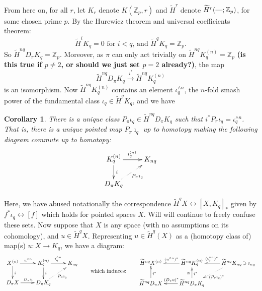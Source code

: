\documentclass{article}
\newcommand{\Z}{\mathbb{Z}}
\newcommand{\sprod}{\wedge}
\newtheorem{cor}[thm]{Corollary}
\begin{document}
From here on, for all $r$, let $K_r$ denote $K(\Z_p,r)$ and $\widetilde H^r$ denote $\widetilde H^r(\textup{---};\Z_p)$, for some chosen prime $p$.  By the Hurewicz theorem and universal coefficients theorem: %
\[\widetilde H^iK_q=0\text{ \ for $i<q$, and \ }\widetilde H^qK_q=\Z_p.\]
So $\widetilde H^{nq}D_\pi K_q= \Z_p$.  Moreover, as $\pi$ can only act trivially on $\widetilde H^{nq} K_q^{(n)}=\Z_p$ \textbf{(is this true if $p\neq2$, or should we just set $p=2$ already?)}, the map
\[
\widetilde H^{nq} D_\pi K_q \xrightarrow{\ i^*\,} \widetilde H^{nq} K_q^{(n)} %
\]
is an isomorphism.  Now $\widetilde H^{nq} K_q^{(n)}$ contains an element $\iota_q^{\sprod n}$, the $n$-fold smash power of the fundamental class $\iota_q \in \widetilde H^q K_q$, and we have
\begin{cor}
There is a unique class $P_\pi \iota_q \in \widetilde H^{nq} D_\pi K_q$ such that $i^* P_\pi \iota_q = \iota_q^{\sprod n}$. That is, there is a unique pointed map $P_\pi\imath_q$ up to homotopy making the following diagram commute up to homotopy:
\[\xymatrix@R=6mm{
K_q^{(n)}\ar[d]^i\ar[r]^{\imath_q^{(n)}}&
K_{nq}\\
D_\pi K_q\ar@{.>}[ru]_{P_\pi\imath_q}
}\]
\end{cor}
\noindent Here, we have abused notationally the correspondence
$\widetilde H^q X  \longleftrightarrow [X, K_q]_\ast$ given by %
$f^* \iota_q  \longleftrightarrow [f]$ which holds for pointed spaces $X$. Will will continue to freely confuse these sets.
Now suppose that $X$ is any space (with no assumptions on its cohomology), and $u\in\widetilde H^qX$.
Representing $u\in \widetilde H^q(X)$ as a (homotopy class of) map(s) $u: X \to K_q$, we have a diagram:%
\[\xymatrix@R=6mm{
X^{(n)}\ar[r]^{u^{\wedge n}}\ar[d]^i&
K_q^{(n)}\ar[d]^i\ar[r]^{\imath_q^{\wedge n}}&
K_{nq}\\
D_\pi X\ar[r]^{D_\pi u}&
D_\pi K_q\ar@{.>}[ru]_{P_\pi\imath_q}
}
\raisebox{-.5cm}{\textup{\qquad which induces:\qquad}}
\xymatrix@R=6mm{
\widetilde H^{nq}X^{(n)}&
\widetilde H^{nq}K_q^{(n)}\ar[l]_{(u^{\wedge n})^*}&
\widetilde H^{nq}K_{nq}\makebox[0cm][l]{$\,\ni\imath_{nq}$}
\ar@{.>}[dl]^{(P_\pi\imath_q)^*}\ar[l]_{(\imath_q^{\wedge n})^*}\\
\widetilde H^{nq}D_\pi X\ar[u]_{i^*}&
\widetilde H^{nq}D_\pi K_q\ar[l]_{(D_\pi u)^*}\ar[u]_{i^*}^\cong
}\phantom{\,\ni\imath_{nq}}\]
\end{document}
